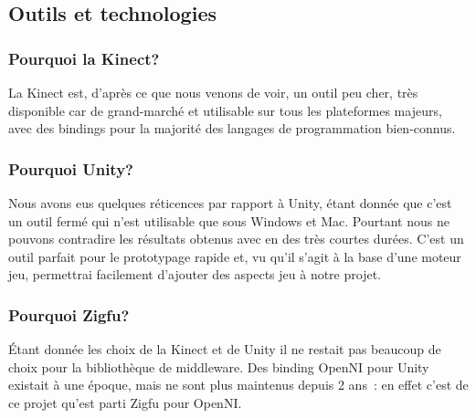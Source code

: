 \subsection{Outils et technologies} 
\subsubsection{Pourquoi la Kinect?}
La Kinect est, d'après ce que nous venons de voir, un outil peu cher, 
très disponible car de grand-marché et utilisable sur tous les plateformes
majeurs, avec des bindings pour la majorité des langages de programmation 
bien-connus.

\subsubsection{Pourquoi Unity?}
Nous avons eus quelques réticences par rapport à Unity, étant donnée que c'est 
un outil fermé qui n'est utilisable que sous Windows et Mac. Pourtant nous ne 
pouvons contradire les résultats obtenus avec en des très courtes durées. C'est
un outil parfait pour le prototypage rapide et, vu qu'il s'agit à la base d'une
moteur jeu, permettrai facilement d'ajouter des aspects jeu à notre projet.

\subsubsection{Pourquoi Zigfu?}
Étant donnée les choix de la Kinect et de Unity il ne restait pas beaucoup de
choix pour la bibliothèque de middleware. Des binding OpenNI pour Unity existait
à une époque, mais ne sont plus maintenus depuis 2 ans~: en effet c'est de ce
projet qu'est parti Zigfu pour OpenNI.
